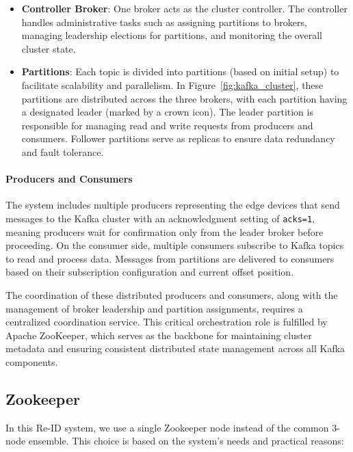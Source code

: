 \begin{itemize}
    \item \textbf{Controller Broker}: One broker acts as the cluster controller. The controller handles administrative tasks such as assigning partitions to brokers, managing leadership elections for partitions, and monitoring the overall cluster state.
    
    \item \textbf{Partitions}: Each topic is divided into partitions (based on initial setup) to facilitate scalability and parallelism. In Figure~\ref{fig:kafka_cluster}, these partitions are distributed across the three brokers, with each partition having a designated leader (marked by a crown icon). The leader partition is responsible for managing read and write requests from producers and consumers. Follower partitions serve as replicas to ensure data redundancy and fault tolerance.
\end{itemize}

\paragraph{Producers and Consumers}

The system includes multiple producers representing the edge devices that send messages to the Kafka cluster with an acknowledgment setting of \texttt{acks=1}, meaning producers wait for confirmation only from the leader broker before proceeding. On the consumer side, multiple consumers subscribe to Kafka topics to read and process data. Messages from partitions are delivered to consumers based on their subscription configuration and current offset position.

The coordination of these distributed producers and consumers, along with the management of broker leadership and partition assignments, requires a centralized coordination service. This critical orchestration role is fulfilled by Apache ZooKeeper, which serves as the backbone for maintaining cluster metadata and ensuring consistent distributed state management across all Kafka components.

\subsection{Zookeeper}

In this Re-ID system, we use a single Zookeeper node instead of the common 3-node ensemble. This choice is based on the system's needs and practical reasons:

